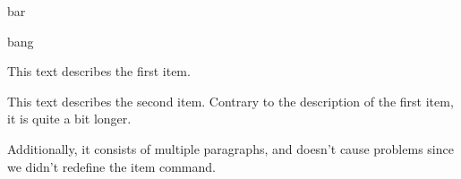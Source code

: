 \documentclass[a4paper]{article}
\begin{document}
\baskerville
\begin{description}[style=nextline]
   \item[foo] bar
   \item[baz] bang
\end{description}

\renewcommand{\descriptionlabel}[1]{\hspace{\labelsep}\RLE{\large\notourdu #1}}
\begin{description}[leftmargin=12pt]
\item[دیپک جوئس]
This text describes the first item.
\item[رو]
This text describes the second item.
Contrary to the description of the first item, it is quite a bit longer.

Additionally, it consists of multiple paragraphs, and doesn't cause problems
since we didn't redefine the item command.
\end{description}
\end{document}
